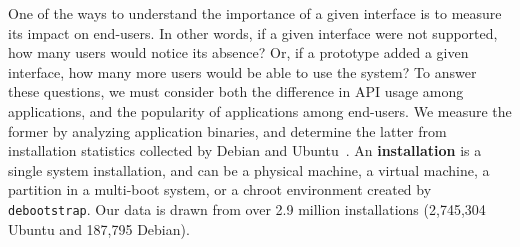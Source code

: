 



One of the ways to understand the importance of a given interface
is to measure its impact on end-users.  
In other words, if a given interface were not supported, how many users would notice its absence?
Or, if a prototype added a given interface, how many more users would be able to use the system?
To answer these questions, we must consider both the 
difference in API usage
among applications,
and the popularity of applications among end-users.
We measure the former by analyzing application binaries,
and determine the latter from installation statistics collected
by Debian and Ubuntu~\citep{ubuntu-popularity,debian-popularity}.
An {\bf installation} is a single system installation, and can 
be a physical machine, a virtual machine, a partition in a multi-boot system,
or a chroot environment created by {\tt debootstrap}.
Our data is drawn from over 2.9 million installations
(2,745,304 Ubuntu and 187,795 Debian).


